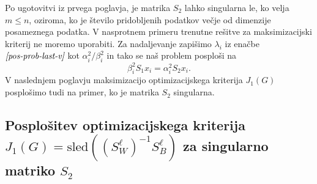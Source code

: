 \documentclass[mat1]{article}
\theoremstyle{definition}
\begin{document}
Po ugotovitvi iz prvega poglavja, je matrika $S_2$ lahko singularna le, ko velja $m \leq n$, oziroma, ko je število pridobljenih podatkov večje od dimenzije posameznega podatka. V nasprotnem primeru trenutne rešitve za maksimizacijski kriterij ne moremo uporabiti. Za nadaljevanje zapišimo $\lambda_i$ iz enačbe $\textit{\eqref{pos-prob-last-v}}$ kot $\alpha_i^2/\beta_i^2$ in tako se naš problem posploši na
\begin{equation} \label{alpha-beta}
\beta_i^2 S_1 x_i = \alpha_i^2 S_2 x_i
\text{.}
\end{equation}
V naslednjem poglavju maksimizacijo optimizacijskega kriterija $J_1(G)$ posplošimo tudi na primer, ko je matrika $S_2$ singularna.

\subsection{Posplošitev optimizacijskega kriterija $J_1(G) = \text{sled}((S^\ell_W)^{-1}S^\ell_B)$ za singularno matriko $S_2$}
\end{document}
